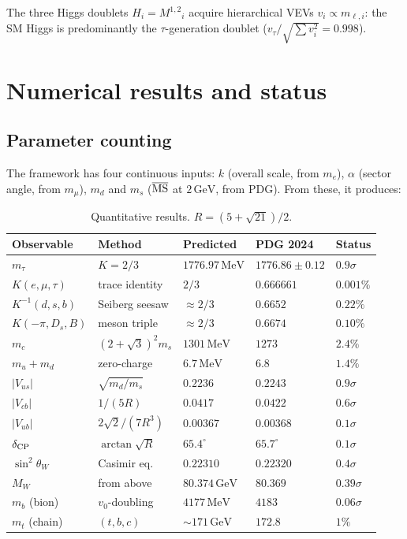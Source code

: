 \documentclass[12pt,a4paper]{article}
\newcommand{\MeV}{\,\mathrm{MeV}}
\newcommand{\GeV}{\,\mathrm{GeV}}
\begin{document}
The three Higgs doublets $H_i = M^{1,2}{}_i$ acquire
hierarchical VEVs $v_i \propto m_{\ell,i}$: the SM Higgs is
predominantly the $\tau$-generation doublet
($v_\tau/\sqrt{\sum v_i^2} = 0.998$).


\section{Numerical results and status}
\label{sec:numerics}

\subsection{Parameter counting}

The framework has four continuous inputs:
$k$ (overall scale, from $m_e$),
$\alpha$ (sector angle, from $m_\mu$),
$m_d$ and $m_s$ ($\overline{\rm MS}$ at $2\GeV$, from PDG).
From these, it produces:

\begin{table}[ht]
\centering\small
\begin{tabular}{lllll}
\hline
Observable & Method & Predicted & PDG 2024 & Status \\
\hline
$m_\tau$ & $K = 2/3$ & $1776.97\MeV$ & $1776.86 \pm 0.12$ & $0.9\sigma$ \\
$K(e,\mu,\tau)$ & trace identity & $2/3$ & $0.666661$ & $0.001\%$ \\
$K^{-1}(d,s,b)$ & Seiberg seesaw & $\approx 2/3$ & $0.6652$ & $0.22\%$ \\
$K(-\pi,D_s,B)$ & meson triple & $\approx 2/3$ & $0.6674$ & $0.10\%$ \\
$m_c$ & $(2{+}\sqrt{3})^2 m_s$ & $1301\MeV$ & $1273$ & $2.4\%$ \\
$m_u + m_d$ & zero-charge & $6.7\MeV$ & $6.8$ & $1.4\%$ \\
$|V_{us}|$ & $\sqrt{m_d/m_s}$ & $0.2236$ & $0.2243$ & $0.9\sigma$ \\
$|V_{cb}|$ & $1/(5R)$ & $0.0417$ & $0.0422$ & $0.6\sigma$ \\
$|V_{ub}|$ & $2\sqrt{2}/(7R^3)$ & $0.00367$ & $0.00368$ & $0.1\sigma$ \\
$\delta_{\rm CP}$ & $\arctan\sqrt{R}$ & $65.4^\circ$ & $65.7^\circ$ & $0.1\sigma$ \\
$\sin^2\theta_W$ & Casimir eq. & $0.22310$ & $0.22320$ & $0.4\sigma$ \\
$M_W$ & from above & $80.374\GeV$ & $80.369$ & $0.39\sigma$ \\
$m_b$ (bion) & $v_0$-doubling & $4177\MeV$ & $4183$ & $0.06\sigma$ \\
$m_t$ (chain) & $(t,b,c)$ & $\sim 171\GeV$ & $172.8$ & $1\%$ \\
\hline
\end{tabular}
\caption{Quantitative results.  $R = (5+\sqrt{21})/2$.}
\label{tab:results}
\end{table}
\end{document}

